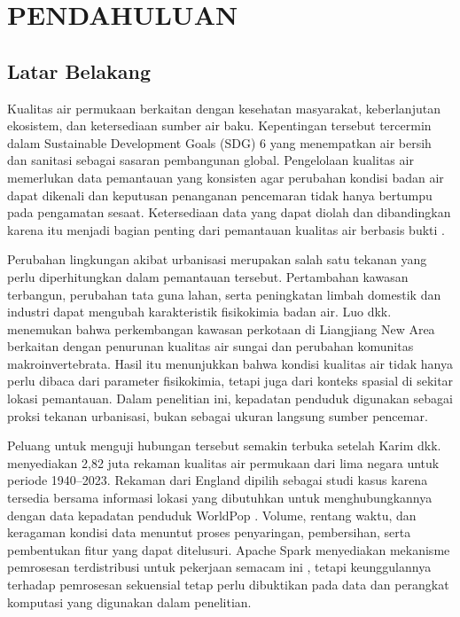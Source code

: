 \chapter{PENDAHULUAN}

\section{Latar Belakang}
\label{section:latarbelakang}
Kualitas air permukaan berkaitan dengan kesehatan masyarakat, keberlanjutan ekosistem, dan ketersediaan sumber air baku. Kepentingan tersebut tercermin dalam Sustainable Development Goals (SDG) 6 yang menempatkan air bersih dan sanitasi sebagai sasaran pembangunan global. Pengelolaan kualitas air memerlukan data pemantauan yang konsisten agar perubahan kondisi badan air dapat dikenali dan keputusan penanganan pencemaran tidak hanya bertumpu pada pengamatan sesaat. Ketersediaan data yang dapat diolah dan dibandingkan karena itu menjadi bagian penting dari pemantauan kualitas air berbasis bukti \cite{karim_comprehensive_2025}.

Perubahan lingkungan akibat urbanisasi merupakan salah satu tekanan yang perlu diperhitungkan dalam pemantauan tersebut. Pertambahan kawasan terbangun, perubahan tata guna lahan, serta peningkatan limbah domestik dan industri dapat mengubah karakteristik fisikokimia badan air. Luo dkk. \cite{luo_impacts_2018} menemukan bahwa perkembangan kawasan perkotaan di Liangjiang New Area berkaitan dengan penurunan kualitas air sungai dan perubahan komunitas makroinvertebrata. Hasil itu menunjukkan bahwa kondisi kualitas air tidak hanya perlu dibaca dari parameter fisikokimia, tetapi juga dari konteks spasial di sekitar lokasi pemantauan. Dalam penelitian ini, kepadatan penduduk digunakan sebagai proksi tekanan urbanisasi, bukan sebagai ukuran langsung sumber pencemar.

Peluang untuk menguji hubungan tersebut semakin terbuka setelah Karim dkk. \cite{karim_comprehensive_2025} menyediakan 2,82 juta rekaman kualitas air permukaan dari lima negara untuk periode 1940--2023. Rekaman dari England dipilih sebagai studi kasus karena tersedia bersama informasi lokasi yang dibutuhkan untuk menghubungkannya dengan data kepadatan penduduk WorldPop \cite{worldpop_uk_density}. Volume, rentang waktu, dan keragaman kondisi data menuntut proses penyaringan, pembersihan, serta pembentukan fitur yang dapat ditelusuri. Apache Spark menyediakan mekanisme pemrosesan terdistribusi untuk pekerjaan semacam ini \cite{zaharia_apache_2016}, tetapi keunggulannya terhadap pemrosesan sekuensial tetap perlu dibuktikan pada data dan perangkat komputasi yang digunakan dalam penelitian.

